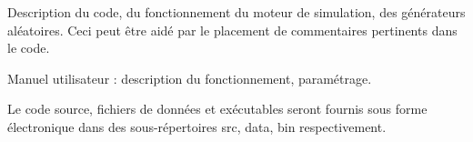 Description du code, du fonctionnement du moteur de simulation, des générateurs aléatoires. Ceci peut être aidé par le placement de commentaires pertinents dans le code.

Manuel utilisateur : description du fonctionnement, paramétrage.

Le code source, fichiers de données et exécutables seront fournis sous forme électronique dans des sous-répertoires src, data, bin respectivement. 